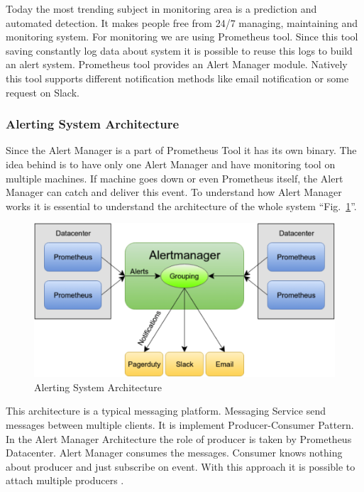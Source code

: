 Today the most trending subject in monitoring area is a prediction and automated detection. It makes people free from 24/7 managing, maintaining and monitoring system.
For monitoring we are using Prometheus tool. Since this tool saving constantly log data about system it is possible to reuse this logs to build an alert system. 
Prometheus tool provides an Alert Manager module. Natively this tool supports different notification methods like email notification or some request on Slack. 

\subsubsection{Alerting System Architecture}\label{Alerting System Architecture}

Since the Alert Manager is a part of Prometheus Tool it has its own binary. The idea behind is to have only one Alert Manager and have monitoring tool on multiple machines. If machine goes down or even Prometheus itself, the Alert Manager can catch and deliver this event. 
To understand how Alert Manager works it is essential to understand the architecture of the whole system ``Fig.~\ref{fig:alert_arch}''.

\begin{figure}[htbp]
\begin{center}
  \includegraphics[width=\linewidth]{components/3/alert_arch.png}
  \caption{Alerting System Architecture}
  \label{fig:alert_arch}
\end{center}
\end{figure}

This architecture is a typical messaging platform. 
Messaging Service send messages between multiple clients. It is implement Producer-Consumer Pattern. In the Alert Manager Architecture the role of producer is taken by Prometheus Datacenter. Alert Manager consumes the messages. Consumer knows nothing about producer and just subscribe on event. With this approach it is possible to attach multiple producers \cite{alert_book}. 

